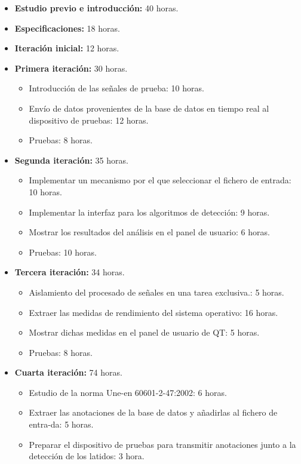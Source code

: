 \begin{itemize}
    \item \textbf{Estudio previo e introducción:} 40 horas.
    \item \textbf{Especificaciones:} 18 horas.
    \item \textbf{Iteración inicial:} 12 horas.
    \item \textbf{Primera iteración:} 30 horas.
    \begin{itemize}
        \item Introducción de las señales de prueba: 10 horas.
        \item Envío de datos provenientes de la base de datos en tiempo real al dispositivo de pruebas: 12 horas. 
        \item Pruebas: 8 horas.
    \end{itemize}
    \item \textbf{Segunda iteración:} 35 horas.
    \begin{itemize}
        \item Implementar un mecanismo por el que seleccionar el fichero de entrada: 10 horas.
        \item Implementar la interfaz para los algoritmos de detección: 9 horas. 
        \item Mostrar los resultados del análisis en el panel de usuario: 6 horas.
        \item Pruebas: 10 horas.
    \end{itemize}
    \item \textbf{Tercera iteración:} 34 horas.
    \begin{itemize}
        \item Aislamiento del procesado de señales en una tarea exclusiva.: 5 horas.
        \item Extraer las medidas de rendimiento del sistema operativo: 16 horas. 
        \item Mostrar dichas medidas en el panel de usuario de QT: 5 horas.
        \item Pruebas: 8 horas.
    \end{itemize}
    \item \textbf{Cuarta iteración:} 74 horas.
    \begin{itemize}
        \item Estudio de la norma Une-en 60601-2-47:2002: 6 horas.
        \item Extraer las anotaciones de la base de datos y añadirlas al fichero de entra-da: 5 horas. 
        \item Preparar el dispositivo de pruebas para transmitir anotaciones junto a la detección de los latidos: 3 hora.

\end{itemize}
\end{itemize}
